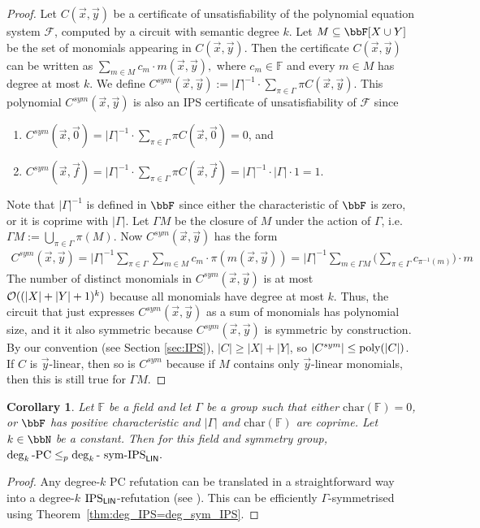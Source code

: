\documentclass[10pt,a4paper]{article}
\newtheorem{corollary}[theorem]{Corollary}
\newcommand{\Oo}{{\cal O}}
\newcommand{\poly}{\text{\upshape poly}}
\newcommand{\Field}{\ensuremath{\mathbb{F}}}
\newcommand{\Circ}{C} %
\newcommand{\F}{\ensuremath{\mathcal{F}}}
\newcommand{\IPSlin}{\text{\upshape IPS}_{\mathsf{LIN}}}
\newcommand{\symIPSlin}{\text{ \upshape sym-IPS}_{\mathsf{LIN}}}
\begin{document}
\begin{proof}
	Let $C(\vec x,\vec y)$ be a certificate of unsatisfiability of the polynomial equation system $\F$, computed by a circuit with semantic degree $k$. Let $M \subseteq \bbF[X \cup Y]$ be the set of monomials appearing in $C(\vec x,\vec y)$.
	Then the certificate $C(\vec x, \vec y)$ can be written as
	$
	\sum_{m \in M}c_m \cdot m(\vec x, \vec y),
	$
	where $c_m \in \Field$ and every $m \in M$ has degree at most $k$.
	We define
	$
	C^{sym}(\vec x, \vec y) := |\Gamma|^{-1} \cdot \sum_{\pi \in \Gamma}\pi C(\vec x, \vec y).
	$
	This polynomial $C^{sym}(\vec x, \vec y)$ is also an IPS certificate of unsatisfiability 
	of $\F$ since  
	\begin{enumerate}[label=(\arabic*)]
		\item $C^{sym}(\vec x, \vec 0) = 
		|\Gamma|^{-1} \cdot \sum_{\pi \in \Gamma} \pi C(\vec x, \vec 0) = 0$, and
		\item $C^{sym}(\vec x, \vec f) = 
		|\Gamma|^{-1} \cdot \sum_{\pi \in \Gamma} \pi C(\vec x, \vec f) = |\Gamma|^{-1} \cdot |\Gamma| \cdot 1 = 1$. 
	\end{enumerate}
	Note that $|\Gamma|^{-1}$ is defined in $\bbF$ since either the characteristic of $\bbF$ is zero, or it is coprime with $|\Gamma|$.  
	Let $\Gamma M$ be the closure of $M$ under the action of $\Gamma$, i.e.
	$
	\Gamma M := \bigcup_{\pi \in \Gamma} \pi(M).   
	$
	Now $C^{sym}(\vec x, \vec y)$ has the form 
	\begin{align*}
		C^{sym}(\vec x, \vec y) = 
		|\Gamma|^{-1} \sum_{\pi \in \Gamma}  \sum_{m \in M} c_m \cdot \pi(m(\vec x, \vec y)) 
		= |\Gamma|^{-1} \sum_{m \in \Gamma M} \Big( \sum_{\pi \in \Gamma} c_{\pi^{-1}(m)}  \Big) \cdot m
	\end{align*}
	The number of distinct monomials in $C^{sym}(\vec x, \vec y)$ is at most $\Oo((|X|+|Y|+1)^{k})$ because all monomials have degree at most $k$. 
	Thus, the circuit that just expresses $C^{sym}(\vec x, \vec y)$ as a sum of monomials has polynomial size, and it it also symmetric because $C^{sym}(\vec x, \vec y)$ is symmetric by construction.
	By our convention (see Section \ref{sec:IPS}), $|C| \geq |X|+|Y|$, so $|C^{sym}| \leq \poly(|C|)$. If $\Circ$ is $\vec{y}$-linear, then so is $\Circ^{sym}$ because if $M$ contains only $\vec y$-linear monomials, then this is still true for $\Gamma M$.
\end{proof}


\begin{corollary}
	\label{cor:boundedDegPC<=symIPS}
	Let $\Field$ be a field and let $\Gamma$ be a group
	such that either $\mathrm{char}(\Field) = 0$, or $\bbF$ has positive characteristic and $|\Gamma|$ and $\mathrm{char}(\Field)$ are coprime. Let $k \in \bbN$ be a constant. Then for this field and symmetry group,
	$
	\deg_k\text{-}\mathrm{PC} \leq_p \deg_k\text{-}\symIPSlin.
	$
\end{corollary}	
\begin{proof}
	Any degree-$k$ PC refutation can be translated in a straightforward way into a degree-$k$ $\IPSlin$-refutation (see \cite[Proposition 3.4]{IPS}). This can be efficiently $\Gamma$-symmetrised using Theorem~\ref{thm:deg_IPS=deg_sym_IPS}.
\end{proof}	
\end{document}
